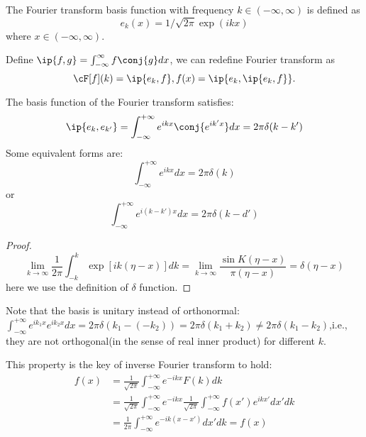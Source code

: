 \begin{refsection}
\begin{definition}
	The Fourier transform basis function with frequency $k \in  (-\infty,\infty)$ is defined as
	$$e_k(x) = 1/\sqrt{2\pi}\exp(ikx)$$
	where $x \in  (-\infty,\infty).$
	
	Define $\ip{f,g} = \int_{-\infty}^{\infty} f \conj{g} dx$, we can redefine Fourier transform as
	$$\cF[f](k) = \ip{e_k,f}, f(x) = \ip{e_k,\ip{e_k,f}}.$$
	
\end{definition}

\begin{lemma}\label{ch:function-sequences-series--approximation:th:unitaryPropertyFourierTransformBasis}
	\cite[268]{prosperetti2013advanced}The basis function of the Fourier transform satisfies:
	$$\ip{e_k,e_{k'}} = \int_{-\infty}^{+\infty} e^{ikx }\conj{e^{ik'x}}dx = 2\pi \delta(k-k')$$
	Some equivalent forms are:
	$$\int_{-\infty}^{+\infty} e^{i k x}dx = 2\pi\delta(k)$$
	or
	$$\int_{-\infty}^{+\infty} e^{i (k-k')x}dx = 2\pi\delta(k-d')$$
\end{lemma}
\begin{proof}
	$$\lim_{k\to \infty} \frac{1}{2\pi} \int_{-k}^k \exp[ik(\eta - x)] dk = \lim_{k\to \infty} \frac{\sin K(\eta - x)}{\pi (\eta - x)} = \delta(\eta - x)$$
	here we use the definition of $\delta$ function.
\end{proof}

\begin{remark}
	Note that the basis is unitary instead of orthonormal: $\int_{-\infty}^{+\infty}e^{ik_1 x}e^{i k_2 x} dx =2\pi \delta(k_1-(-k_2)) = 2\pi \delta(k_1 + k_2)  \neq 2\pi \delta(k_1-k_2)$,i.e., they are not orthogonal(in the sense of real inner product) for different $k$.
\end{remark}

\begin{remark}
	This property is the key of inverse Fourier transform to hold:
	\begin{align*}
	f(x) &= \frac{1}{\sqrt{2\pi}}\int_{-\infty}^{+\infty} e^{-i k x} F(k) dk \\
	&=\frac{1}{\sqrt{2\pi}}\int_{-\infty}^{+\infty} e^{-i k x}\frac{1}{\sqrt{2\pi}}\int_{-\infty}^{+\infty} f(x')  e^{i k x'}dx'dk \\
	&=\frac{1}{2\pi}\int_{-\infty}^{+\infty} e^{-i k (x-x')} dx'dk = f(x)
	\end{align*}
\end{remark}



\end{refsection}
